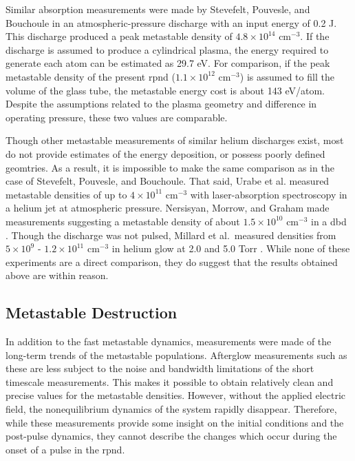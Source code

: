 Similar absorption measurements were made by Stevefelt, Pouvesle, and Bouchoule
\cite{Pouvesle1988} in an atmospheric-pressure discharge with an input energy of
0.2 J. This discharge produced a peak metastable density of $4.8\times10^{14}$
cm$^{-3}$. If the discharge is assumed to produce a cylindrical plasma, the
energy required to generate each atom can be estimated as 29.7 eV. For
comparison, if the peak metastable density of the present \acs{rpnd}
($1.1\times10^{12}$ cm$^{-3}$) is assumed to fill the volume of the glass tube,
the metastable energy cost is about 143 eV/atom. Despite the assumptions related
to the plasma geometry and difference in operating pressure, these two values
are comparable.

Though other metastable measurements of similar helium discharges exist, most do
not provide estimates of the energy deposition, or possess poorly defined
geomtries. As a result, it is impossible to make the same comparison as in the
case of Stevefelt, Pouvesle, and Bouchoule. That said, Urabe et al.
\cite{Urabe2010} measured metastable densities of up to $4\times10^{11}$
cm$^{-3}$ with laser-absorption spectroscopy in a helium jet at atmospheric
pressure. Nersisyan, Morrow, and Graham made measurements suggesting a
metastable density of about $1.5\times10^{10}$ cm$^{-3}$ in a \acs{dbd}
\cite{Nersisyan2004}. Though the discharge was not pulsed, Millard et al.\
measured densities from $5\times10^9$ - $1.2\times10^{11}$ cm$^{-3}$ in helium
glow at 2.0 and 5.0 Torr \cite{Millard1998}. While none of these experiments are
a direct comparison, they do suggest that the results obtained above are within
reason.

\subsection{Metastable Destruction}\label{sec:destruct}

In addition to the fast metastable dynamics, measurements were made of the
long-term trends of the metastable populations. Afterglow measurements such as
these are less subject to the noise and bandwidth limitations of the short
timescale measurements. This makes it possible to obtain relatively clean and
precise values for the metastable densities. However, without the applied
electric field, the nonequilibrium dynamics of the system rapidly disappear.
Therefore, while these measurements provide some insight on the initial
conditions and the post-pulse dynamics, they cannot describe the changes which
occur during the onset of a pulse in the \acs{rpnd}.

